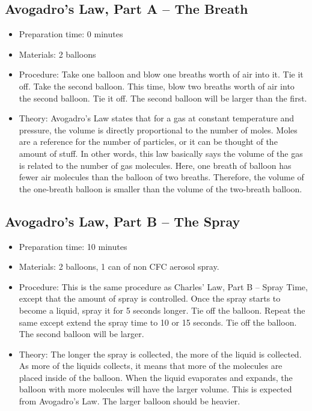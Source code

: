 \subsection{Avogadro’s Law, Part A – The Breath}
\begin{itemize}
\item{Preparation time: 0 minutes}
\item{Materials: 2 balloons}
\item{Procedure: Take one balloon and blow one breaths worth of air into it. Tie it off. Take the second balloon. This time, blow two breaths worth of air into the second balloon. Tie it off. The second balloon will be larger than the first. }
\item{Theory: Avogadro’s Law states that for a gas at constant temperature and pressure, the volume is directly proportional to the number of moles. Moles are a reference for the number of particles, or it can be thought of the amount of stuff. In other words, this law basically says the volume of the gas is related to the number of gas molecules. Here, one breath of balloon has fewer air molecules than the balloon of two breaths. Therefore, the volume of the one-breath balloon is smaller than the volume of the two-breath balloon.}
\end{itemize}

\subsection{Avogadro’s Law, Part B – The Spray}
\begin{itemize}
\item{Preparation time: 10 minutes}
\item{Materials: 2 balloons, 1 can of non CFC aerosol spray.}
\item{Procedure: This is the same procedure as Charles’ Law, Part B – Spray Time, except that the amount of spray is controlled. Once the spray starts to become a liquid, spray it for 5 seconds longer. Tie off the balloon. Repeat the same except extend the spray time to 10 or 15 seconds. Tie off the balloon. The second balloon will be larger.}
\item{Theory: The longer the spray is collected, the more of the liquid is collected. As more of the liquids collects, it means that more of the molecules are placed inside of the balloon. When the liquid evaporates and expands, the balloon with more molecules will have the larger volume. This is expected from Avogadro’s Law. The larger balloon should be heavier.}
\end{itemize}

